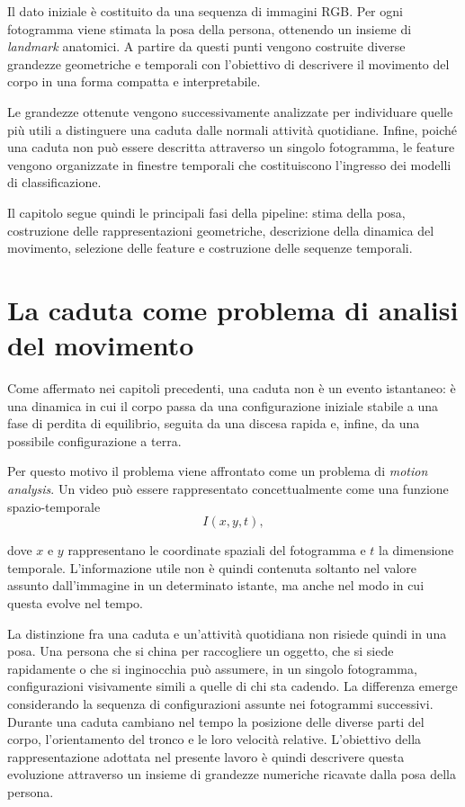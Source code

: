 Il dato iniziale è costituito da una sequenza di immagini RGB. Per ogni fotogramma viene stimata la posa della persona, ottenendo un insieme di \emph{landmark} anatomici. A partire da questi punti vengono costruite diverse grandezze geometriche e temporali con l'obiettivo di descrivere il movimento del corpo in una forma compatta e interpretabile.

Le grandezze ottenute vengono successivamente analizzate per individuare quelle più utili a distinguere una caduta dalle normali attività quotidiane. Infine, poiché una caduta non può essere descritta attraverso un singolo fotogramma, le feature vengono organizzate in finestre temporali che costituiscono l'ingresso dei modelli di classificazione.

Il capitolo segue quindi le principali fasi della pipeline: stima della posa, costruzione delle rappresentazioni geometriche, descrizione della dinamica del movimento, selezione delle feature e costruzione delle sequenze temporali.

\section{La caduta come problema di analisi del movimento}
\label{sec:motion}

Come affermato nei capitoli precedenti, una caduta non è un evento istantaneo: è una dinamica in cui il corpo passa da una configurazione iniziale stabile a una fase di perdita di equilibrio, seguita da una discesa rapida e, infine, da una possibile configurazione a terra.

Per questo motivo il problema viene affrontato come un problema di \emph{motion analysis}. Un video può essere rappresentato concettualmente come una funzione spazio-temporale
\[
I(x,y,t),
\]

dove \(x\) e \(y\) rappresentano le coordinate spaziali del fotogramma e \(t\) la dimensione temporale. L'informazione utile non è quindi contenuta soltanto nel valore assunto dall'immagine in un determinato istante, ma anche nel modo in cui questa evolve nel tempo.

La distinzione fra una caduta e un'attività quotidiana non risiede quindi in una posa. Una persona che si china per raccogliere un oggetto, che si siede rapidamente o che si inginocchia può assumere, in un singolo fotogramma, configurazioni visivamente simili a quelle di chi sta cadendo.
La differenza emerge considerando la sequenza di configurazioni assunte nei fotogrammi successivi. Durante una caduta cambiano nel tempo la posizione delle diverse parti del corpo, l'orientamento del tronco e le loro velocità relative. L'obiettivo della rappresentazione adottata nel presente lavoro è quindi descrivere questa evoluzione attraverso un insieme di grandezze numeriche ricavate dalla posa della persona.

